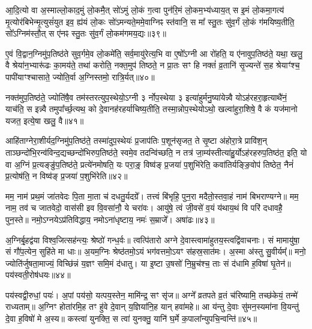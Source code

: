 आ॒दि॒त्यो वा अ॒स्माल्लो॒काद॒मुं लो॒कमै॒त् सो॑\-ऽमुं लो॒कं ग॒त्वा पुन॑रि॒मं लो॒कम॒भ्य॑ध्याय॒त् स इ॒मं लो॒कमा॒गत्य॑ मृ॒त्योर॑बिभेन्मृ॒त्युसं॑युत इव॒ ह्य॑यं लो॒कः सो॑\-ऽमन्यते॒ममे॒वाग्निꣴ स्त॑वानि॒ स मा᳚ स्तु॒तः सु॑व॒र्गं लो॒कं ग॑मयिष्य॒तीति॒ सो᳚\-ऽग्निम॑स्तौ॒त् स ए॑नꣴ स्तु॒तः सु॑व॒र्गं लो॒कम॑गमय॒द्यः॥३९॥

ए॒वं वि॒द्वान॒ग्निमु॑प॒तिष्ठ॑ते सुव॒र्गमे॒व लो॒कमे॑ति॒ सर्व॒मायु॑रेत्य॒भि वा ए॒षो᳚\-ऽग्नी आ रो॑हति॒ य ए॑नावुप॒तिष्ठ॑ते॒ यथा॒ खलु॒ वै श्रेया॑न॒भ्यारू॑ढः का॒मय॑ते॒ तथा॑ करोति॒ नक्त॒मुप॑ तिष्ठते॒ न प्रा॒तः सꣳ हि नक्तं॑ व्र॒तानि॑ सृ॒ज्यन्ते॑ स॒ह श्रेयाꣳ॑श्च॒ पापी॑याꣳश्चासाते॒ ज्योति॒र्वा अ॒ग्निस्तमो॒ रात्रि॒र्यत्॥४०॥

नक्त॑मुप॒तिष्ठ॑ते॒ ज्योति॑षै॒व तम॑स्तरत्युप॒स्थेयो॒\-ऽग्नी ३ र्नोप॒स्थेया ३ इत्या॑हुर्मनु॒ष्या॑येन्न्वै यो\-ऽह॑रहरा॒हृत्याथै॑नं॒ याच॑ति॒ स इन्न्वै तमुपा᳚र्च्छ॒त्यथ॒ को दे॒वानह॑रहर्याचिष्य॒तीति॒ तस्मा॒न्नोप॒स्थेयो\-ऽथो॒ खल्वा॑हुरा॒शिषे॒ वै कं यज॑मानो यजत॒ इत्ये॒षा खलु॒ वै॥४१॥

आहि॑ताग्नेरा॒शीर्यद॒ग्निमु॑प॒तिष्ठ॑ते॒ तस्मा॑दुप॒स्थेयः॑ प्र॒जाप॑तिः प॒शून॑सृजत॒ ते सृ॒ष्टा अ॑होरा॒त्रे प्रावि॑श॒न् ताञ्छन्दो॑भि॒रन्व॑विन्द॒द्यच्छन्दो॑भिरुप॒तिष्ठ॑ते॒ स्वमे॒व तदन्वि॑च्छति॒ न तत्र॑ जा॒म्य॑स्तीत्या॑हु॒र्यो\-ऽह॑रहरुप॒तिष्ठ॑त॒ इति॒ यो वा अ॒ग्निं प्र॒त्यङ्ङु॑प॒तिष्ठ॑ते॒ प्रत्ये॑नमोषति॒ यः परा॒ङ्॒ विष्व॑ङ् प्र॒जया॑ प॒शुभि॑रेति॒ कवा॑तिर्यङ्ङि॒वोप॑ तिष्ठेत॒ नैनं॑ प्र॒त्योष॑ति॒ न विष्व॑ङ् प्र॒जया॑ प॒शुभि॑रेति॥४२॥

{\anuvakamend[{सि॒क्तस्य॑ स॒ह भ॑वति॒ यो यत्खलु॒ वै प॒शुभि॒स्त्रयो॑दश च॥९॥}]}

मम॒ नाम॑ प्रथ॒मं जा॑तवेदः पि॒ता मा॒ता च॑ दधतु॒र्यदग्रे᳚। तत्त्वं बि॑भृहि॒ पुन॒रा मदैतो॒स्तवा॒हं नाम॑ बिभराण्यग्ने॥ मम॒ नाम॒ तव॑ च जातवेदो॒ वास॑सी इव वि॒वसा॑नौ॒ ये चरा॑वः। आयु॑षे॒ त्वं जी॒वसे॑ व॒यं य॑थाय॒थं वि परि॑ दधावहै॒ पुन॒स्ते॥ नमो॒\-ऽग्नये\-ऽप्र॑तिविद्धाय॒ नमो\-ऽना॑धृष्टाय॒ नमः॑ स॒म्राजे᳚। अषा॑ढः॥४३॥

अ॒ग्निर्बृ॒हद्व॑या विश्व॒जित्सह॑न्त्यः॒ श्रेष्ठो॑ गन्ध॒र्वः॥ त्वत्पि॑तारो अग्ने दे॒वास्त्वामा॑हुतय॒स्त्वद्वि॑वाचनाः। सं मामायु॑षा॒ सं गौ॑प॒त्येन॒ सुहि॑ते मा धाः॥ अ॒यम॒ग्निः श्रेष्ठ॑तमो॒\-ऽयं भग॑वत्तमो॒\-ऽयꣳ स॑हस्र॒सात॑मः। अ॒स्मा अ॑स्तु सु॒वीर्यम्᳚॥ मनो॒ ज्योति॑र्जुषता॒माज्यं॒ विच्छि॑न्नं य॒ज्ञꣳ समि॒मं द॑धातु। या इ॒ष्टा उ॒षसो॑ नि॒म्रुच॑श्च॒ ताः सं द॑धामि ह॒विषा॑ घृ॒तेन॑॥ पय॑स्वती॒रोष॑धयः॥४४॥

पय॑स्वद्वी॒रुधां॒ पयः॑। अ॒पां पय॑सो॒ यत्पय॒स्तेन॒ मामि॑न्द्र॒ सꣳ सृ॑ज॥ अग्ने᳚ व्रतपते व्र॒तं च॑रिष्यामि॒ तच्छ॑केयं॒ तन्मे॑ राध्यताम्॥ अ॒ग्निꣳ होता॑रमि॒ह तꣳ हु॑वे दे॒वान् य॒ज्ञिया॑नि॒ह यान् हवा॑महे॥ आ य॑न्तु दे॒वाः सु॑मन॒स्यमा॑ना वि॒यन्तु॑ दे॒वा ह॒विषो॑ मे अ॒स्य॥ कस्त्वा॑ युनक्ति॒ स त्वा॑ युनक्तु॒ यानि॑ घ॒र्मे क॒पाला᳚न्युपचि॒न्वन्ति॑॥४५॥

